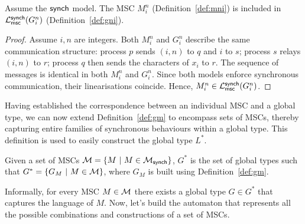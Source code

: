 \bigskip

\begin{lemma}\label{lmm:msgs}
Assume the $\mathsf{synch}$ model.
The MSC $M^n_i$ (Definition~\ref{def:mni}) is included in 
$\mathcal{L}_{\mathsf{msc}}^{\mathsf{synch}}(G_i^n)$ (Definition~\ref{def:gni}).
\end{lemma}

\begin{proof}
	Assume $i,n$ are integers.
	Both $M^n_i$ and $G_i^n$ describe the same communication structure:
	process $p$ sends $(i,n)$ to $q$ and $i$ to $s$;
	process $s$ relays $(i,n)$ to $r$;
	process $q$ then sends the characters of $x_i$ to $r$.
	The sequence of messages is identical in both 
	$M^n_i$ and $G_i^n$. Since both models enforce synchronous communication, 
	their linearisations coincide. 
	Hence, $M^n_i \in \mathcal{L}_{\mathsf{msc}}^{\mathsf{synch}}(G_i^n)$.
\end{proof}

Having established the correspondence between an individual MSC and a  
global type, we can now extend Definition~\ref{def:gm} to encompass  
sets of MSCs, thereby capturing entire families of synchronous  
behaviours within a global type. This definition is used to easily 
construct the global type $L^*$.

\bigskip

\begin{definition}[$G^*$]\label{def:gstar}
	Given a set of MSCs $\mathcal{M} =\{M\ |\ M\in\mscsetofmodel{\synchmodel}\}$,
	$G^*$ is the set of global types such that $G^*=\{G_M\ |\ M \in \mathcal{M}\}$,
	where $G_M$ is built using Definition~\ref{def:gm}.
\end{definition}

Informally, for every MSC $M\in\mathcal{M}$ there exists a global type $G\in G^*$ that
captures the language of $M$. Now, let's build the automaton that represents
all the possible combinations and constructions of a set of MSCs.

\bigskip

